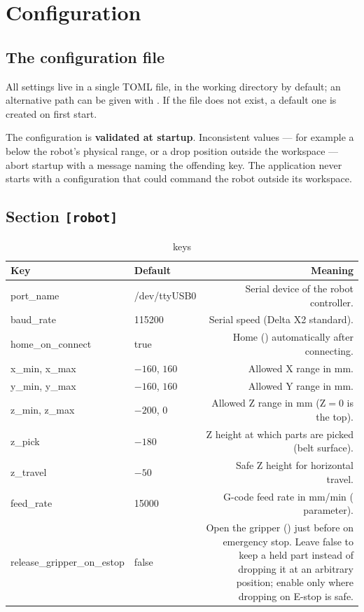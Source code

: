 \chapter{Configuration}

\section{The configuration file}
%
All settings live in a single TOML file,  in the
working directory by default; an alternative path can be given with
. If the file does not exist, a default one is
created on first start.

\begin{notebox}
  The configuration is \textbf{validated at startup}. Inconsistent values
  --- for example a  below the robot's physical range, or a
  drop position outside the workspace --- abort startup with a message
  naming the offending key. The application never starts with a
  configuration that could command the robot outside its workspace.
\end{notebox}

\section{Section \texttt{[robot]}}
%
\begin{table}[h]
  \centering
  \begin{tabularx}{\textwidth}{KTD}
    \toprule
    \textbf{Key} & \textbf{Default} & \textbf{Meaning} \\
    \midrule
    port\_name & /dev/ttyUSB0 & Serial device of the robot controller. \\
    baud\_rate & 115200 & Serial speed (Delta X2 standard). \\
    home\_on\_connect & true & Home () automatically after connecting. \\
    x\_min, x\_max & $-160$, $160$ & Allowed X range in mm. \\
    y\_min, y\_max & $-160$, $160$ & Allowed Y range in mm. \\
    z\_min, z\_max & $-200$, $0$ & Allowed Z range in mm (Z$=0$ is the top). \\
    z\_pick & $-180$ & Z height at which parts are picked (belt surface). \\
    z\_travel & $-50$ & Safe Z height for horizontal travel. \\
    feed\_rate & 15000 & G-code feed rate in mm/min ( parameter). \\
    release\_gripper\_on\_estop & false & Open the gripper () just
      before  on emergency stop. Leave false to keep a held part
      instead of dropping it at an arbitrary position; enable only where
      dropping on E-stop is safe. \\
    \bottomrule
  \end{tabularx}
  \caption{\cfg{[robot]} keys}
\end{table}


